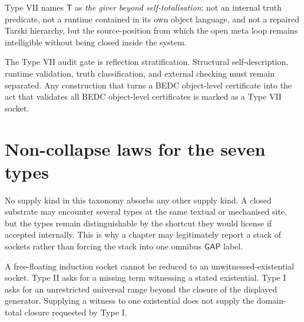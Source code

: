 \begin{definition}
\label{def:transcendental-supply-type-VII-reading}
Type VII names $\mathsf{T}$ as \emph{the giver beyond self-totalisation}: not an internal truth predicate, not a runtime contained in its own object language, and not a repaired Tarski hierarchy, but the source-position from which the open meta loop remains intelligible without being closed inside the system.
\end{definition}

\begin{remark}
\label{rem:transcendental-supply-type-VII-gate}
The Type VII audit gate is reflection stratification. Structural self-description, runtime validation, truth classification, and external checking must remain separated. Any construction that turns a BEDC object-level certificate into the act that validates all BEDC object-level certificates is marked as a Type VII socket.
\end{remark}


\section{Non-collapse laws for the seven types}
\label{sec:transcendental-supply-non-collapse}

\begin{principle}
\label{prin:transcendental-supply-no-absorption}
No supply kind in this taxonomy absorbs any other supply kind. A closed substrate may encounter several types at the same textual or mechanised site, but the types remain distinguishable by the shortcut they would license if accepted internally. This is why a chapter may legitimately report a stack of sockets rather than forcing the stack into one omnibus $\mathsf{GAP}$ label.
\end{principle}

\begin{lemma}
\label{lem:transcendental-supply-I-not-II}
A free-floating induction socket cannot be reduced to an unwitnessed-existential socket. Type II asks for a missing term witnessing a stated existential. Type I asks for an unrestricted universal range beyond the closure of the displayed generator. Supplying a witness to one existential does not supply the domain-total closure requested by Type I.
\end{lemma}

